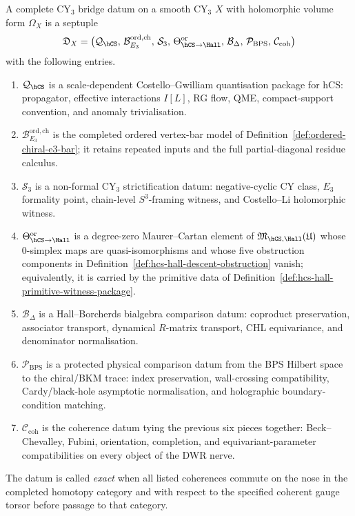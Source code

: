 \begin{definition}
\label{def:complete-cy3-bridge-datum}
A complete CY$_3$ bridge datum on a smooth CY$_3$ $X$ with holomorphic
volume form $\Omega_X$ is a septuple
\[
 \mathfrak D_X
 =
 \bigl(
 \mathcal Q_{\hCS},\,
 \mathcal B^{\mathrm{ord,ch}}_{E_3},\,
 \mathcal S_3,\,
 \Theta_{\hCS\to\Hall}^{\mathrm{or}},\,
 \mathcal B_{\Delta},\,
 \mathcal P_{\mathrm{BPS}},\,
 \mathcal C_{\mathrm{coh}}
 \bigr)
\]
with the following entries.
\begin{enumerate}
\item $\mathcal Q_{\hCS}$ is a scale-dependent Costello--Gwilliam
quantisation package for hCS: propagator, effective interactions
$I[L]$, RG flow, QME, compact-support convention, and anomaly
trivialisation.
\item $\mathcal B^{\mathrm{ord,ch}}_{E_3}$ is the completed ordered
vertex-bar model of Definition~\ref{def:ordered-chiral-e3-bar}; it
retains repeated inputs and the full partial-diagonal residue calculus.
\item $\mathcal S_3$ is a non-formal CY$_3$ strictification datum:
negative-cyclic CY class, $E_3$ formality point, chain-level
$S^3$-framing witness, and Costello--Li holomorphic witness.
\item $\Theta_{\hCS\to\Hall}^{\mathrm{or}}$ is a degree-zero
Maurer--Cartan element of
$\mathfrak M_{\hCS,\Hall}(\mathfrak U)$ whose $0$-simplex maps are
quasi-isomorphisms and whose five obstruction components in
Definition~\ref{def:hcs-hall-descent-obstruction} vanish; equivalently,
it is carried by the primitive data of
Definition~\ref{def:hcs-hall-primitive-witness-package}.
\item $\mathcal B_{\Delta}$ is a Hall--Borcherds bialgebra comparison
datum: coproduct preservation, associator transport, dynamical
$R$-matrix transport, CHL equivariance, and denominator normalisation.
\item $\mathcal P_{\mathrm{BPS}}$ is a protected physical comparison
datum from the BPS Hilbert space to the chiral/BKM trace: index
preservation, wall-crossing compatibility, Cardy/black-hole asymptotic
normalisation, and holographic boundary-condition matching.
\item $\mathcal C_{\mathrm{coh}}$ is the coherence datum tying the
previous six pieces together: Beck--Chevalley, Fubini, orientation,
completion, and equivariant-parameter compatibilities on every object
of the DWR nerve.
\end{enumerate}
The datum is called \emph{exact} when all listed coherences commute on
the nose in the completed homotopy category and with respect to the
specified coherent gauge torsor before passage to that category.
\end{definition}

